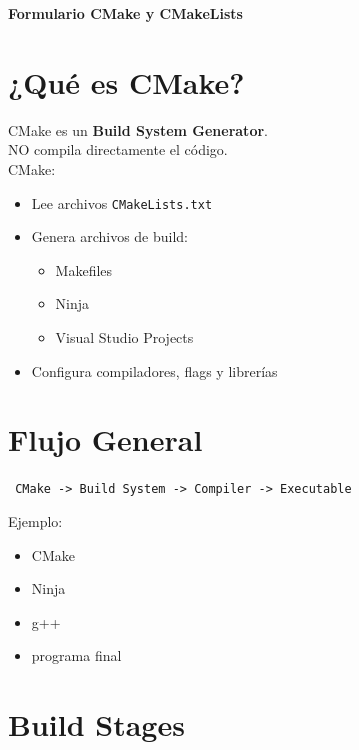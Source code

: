 \documentclass[a4paper,11pt]{article}
\begin{document}
\begin{center}
    {\Large \textbf{Formulario CMake y CMakeLists}}\\
\end{center}


\section*{¿Qué es CMake?}

CMake es un \textbf{Build System Generator}.\\

NO compila directamente el código.\\

CMake:
\begin{itemize}
    \item Lee archivos \texttt{CMakeLists.txt}
    \item Genera archivos de build:
    \begin{itemize}
        \item Makefiles
        \item Ninja
        \item Visual Studio Projects
    \end{itemize}
    \item Configura compiladores, flags y librerías
\end{itemize}


\section*{Flujo General}

\begin{center}
\texttt{
CMake -> Build System -> Compiler -> Executable
}
\end{center}

Ejemplo:
\begin{itemize}
    \item CMake
    \item Ninja
    \item g++
    \item programa final
\end{itemize}


\section*{Build Stages}
\end{document}

